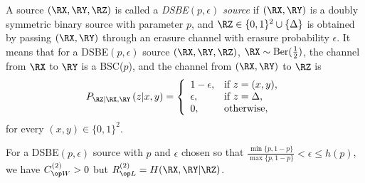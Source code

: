 A source $(\RX, \RY, \RZ)$ is called a \emph{DSBE$(p,\epsilon)$ source} if $(\RX, \RY)$ is a doubly  symmetric binary source with parameter $p$, and $\RZ\in \{0,1\}^2 \cup \{\Delta\}$ is obtained by passing $(\RX, \RY)$ through an erasure channel with erasure probability $\epsilon$. It means that for a DSBE$(p,\epsilon)$ source $(\RX, \RY, \RZ)$, $\RX \sim \text{Ber}(\frac{1}{2})$, the channel from $\RX$ to $\RY$ is a BSC($p$), and the channel from $(\RX, \RY)$ to $\RZ$ is 
 $$P_{\RZ | \RX,\RY}\left(z|x,y\right)= \left\{\begin{array}{ll} 1-\epsilon, & \text{if } z=(x,y),\\
        \epsilon, & \text{if } z=\Delta,\\
        0, & \text{otherwise},
        \end{array}\right.$$ 
for every $(x,y)\in \{0,1\}^2$.
\begin{lemma}\label{lem:twowaycounter}
For a DSBE$(p,\epsilon)$ source with $p$ and $\epsilon$ chosen so that $ \frac{\min\{p,1-p\}}{\max\{p,1-p\}} < \epsilon \leq h(p)$, we have $\wskc^{(2)}>0$ but $\rl^{(2)}=H(\RX,\RY|\RZ)$.
\end{lemma}

